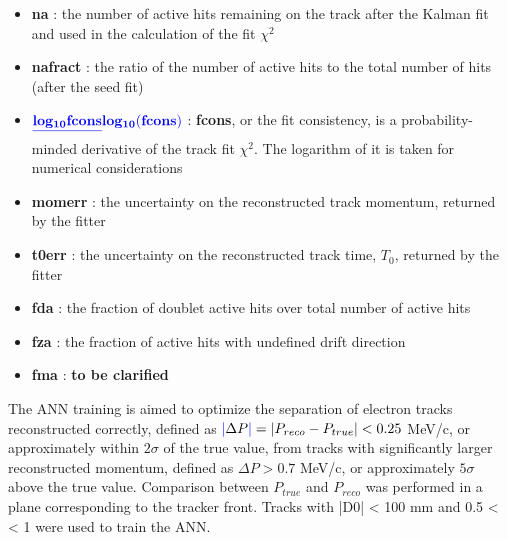 \begin{itemize}
\item
  {\bf na } : {\blue the} number of  {\blue active} hits remaining on the track
  after the Kalman fit and used in the calculation of the fit $\chi^2$
\item
  {\bf nafract} :  {\blue the} ratio of the number of active hits to the total number
  of hits (after the seed fit)
\item
  ${\bf \strike{log_{10}{fcons}} {\blue log_{10}(fcons)}}$ : {\bf fcons}, or {\blue the} fit consistency{\blue ,}
  is a probability-minded derivative  {\blue of} the track fit $\chi^2$. {\blue The l}ogarithm
  of it is taken  {\blue for} numerical considerations
\item
  {\bf momerr} : {\blue the} uncertainty on the reconstructed track momentum, returned by the fitter
\item
  {\bf t0err} : {\blue the} uncertainty on the reconstructed track time,  {\blue $T_0$}, returned by the fitter
\item
  {\bf fda} :  {\blue the} fraction of  {\blue doublet} active hits {\blue over total number of active hits}
\item
  {\bf fza } :  {\blue the} fraction of active hits with undefined drift direction
\item
  {\bf fma } : {\bf \red to be clarified}
\end{itemize}

The ANN training is aimed to optimize the separation of electron tracks reconstructed correctly, 
 {\blue defined as} ${\color{blue} |}\Delta{P} {\color{blue}|}= |P_{reco}-P_{true}| < 0.25$ MeV/c, or approximately within 
$2\sigma$  {\blue of} the true value, from tracks
{\blue with significantly larger reconstructed momentum, defined as}
 $\Delta{P} > 0.7$ MeV/c,  {\blue or approximately} $5\sigma$
above the true value.
Comparison between $P_{true}$ and $P_{reco}$ was performed in a plane corresponding to the
tracker front.
%
{\blue Tracks with |D0| < 100 mm and 0.5 < \tandip < 1 were used to train the ANN.}

